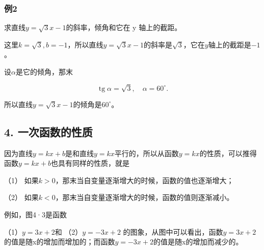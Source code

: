 \subsubsection{例2}

求直线\(y = \sqrt{3}x - 1\)的斜率，倾角和它在 y 轴上的截距。

这里\(k = \sqrt{3}, b = -1\)，所以直线\(y = \sqrt{3} x - 1\)的斜率是\(\sqrt{3}\)，它在\(y\)轴上的截距是\(-1\)。

设\(\alpha\)是它的倾角，那末

\[
\operatorname{tg} \alpha = \sqrt{3}, \quad \alpha = 60^{\circ}.
\]

所以直线\(y=\sqrt{3}x-1\)的倾角是\(60^{\circ}\)。

\subsection{4. 一次函数的性质}

因为直线\(y = kx + b\)是和直线\(y = kx\)平行的，所以从函数\(y = kx\)的性质，可以推得函数\(y = kx + b\)也具有同样的性质，就是

（1） 如果\(k > 0\)，那末当自变量逐渐增大的时候，函数的值也逐渐增大；

（2） 如果\(k < 0\)，那末当自变量逐渐增大的时候，函数的值则逐渐减小。

例如，图4·3是函数

（1）\(y = 3x + 2\)和 （2）\(y = -3x + 2\)
的图象，从图中可以看出，函数\(y=3x+2\)的值是随x的增加而增加的；而函数\(y=-3x+2\)的值是随x的增加而减少的。

